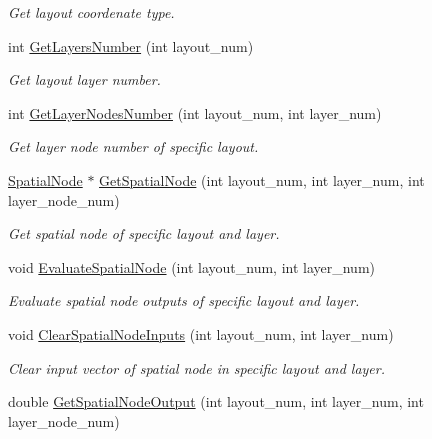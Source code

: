 \begin{DoxyCompactItemize}
\begin{DoxyCompactList}\small\item\em Get layout coordenate type. \end{DoxyCompactList}\item 
int \hyperlink{class_a_n_n___u_s_m_1_1_substrate_aad34de8fde9ecc3cbb1ebd71548cbc04}{Get\-Layers\-Number} (int layout\-\_\-num)
\begin{DoxyCompactList}\small\item\em Get layout layer number. \end{DoxyCompactList}\item 
int \hyperlink{class_a_n_n___u_s_m_1_1_substrate_af66462bbcfa00eda01f62bf72269860e}{Get\-Layer\-Nodes\-Number} (int layout\-\_\-num, int layer\-\_\-num)
\begin{DoxyCompactList}\small\item\em Get layer node number of specific layout. \end{DoxyCompactList}\item 
\hyperlink{class_a_n_n___u_s_m_1_1_spatial_node}{Spatial\-Node} $\ast$ \hyperlink{class_a_n_n___u_s_m_1_1_substrate_a44672627ec3b103ced54233a29b26486}{Get\-Spatial\-Node} (int layout\-\_\-num, int layer\-\_\-num, int layer\-\_\-node\-\_\-num)
\begin{DoxyCompactList}\small\item\em Get spatial node of specific layout and layer. \end{DoxyCompactList}\item 
void \hyperlink{class_a_n_n___u_s_m_1_1_substrate_a1fc288998e09868f2f8c31e18724106e}{Evaluate\-Spatial\-Node} (int layout\-\_\-num, int layer\-\_\-num)
\begin{DoxyCompactList}\small\item\em Evaluate spatial node outputs of specific layout and layer. \end{DoxyCompactList}\item 
void \hyperlink{class_a_n_n___u_s_m_1_1_substrate_a8c3e61424eede374c5755197a777d354}{Clear\-Spatial\-Node\-Inputs} (int layout\-\_\-num, int layer\-\_\-num)
\begin{DoxyCompactList}\small\item\em Clear input vector of spatial node in specific layout and layer. \end{DoxyCompactList}\item 
double \hyperlink{class_a_n_n___u_s_m_1_1_substrate_a94b7b35d3fff9488ad23f4f8ceb8243b}{Get\-Spatial\-Node\-Output} (int layout\-\_\-num, int layer\-\_\-num, int layer\-\_\-node\-\_\-num)

\end{DoxyCompactItemize}
